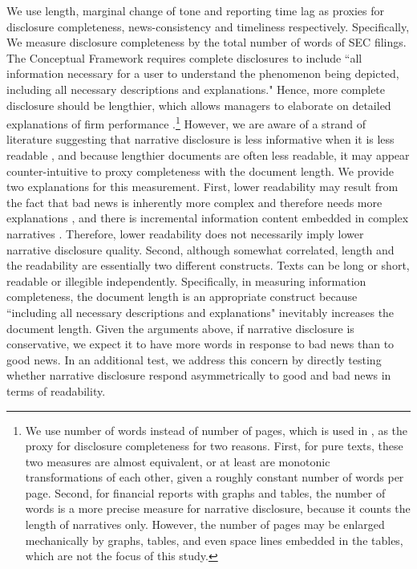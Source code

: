 \documentclass[letterpaper,11pt]{article}
\begin{document}
\begin{spacing}{1.5}
\noindent We use length, marginal change of tone and reporting time lag as proxies for disclosure completeness, news-consistency and timeliness respectively. Specifically, We measure disclosure completeness by the total number of words of SEC filings. The Conceptual Framework requires complete disclosures to include ``all information necessary for a user to understand the phenomenon being depicted, including all necessary descriptions and explanations." \cite[QC12]{fasbConceptualFrameworkFinancial2018} Hence, more complete disclosure should be lengthier, which allows managers to elaborate on detailed explanations of firm performance \cite{leuzDisclosureCostCapital2009}.\footnote{We use number of words instead of number of pages, which is used in , as the proxy for disclosure completeness for two reasons. First, for pure texts, these two measures are almost equivalent, or at least are monotonic transformations of each other, given a roughly constant number of words per page. Second, for financial reports with graphs and tables, the number of words is a more precise measure for narrative disclosure, because it counts the length of narratives only. However, the number of pages may be enlarged mechanically by graphs, tables, and even space lines embedded in the tables, which are not the focus of this study.} However, we are aware of a strand of literature suggesting that narrative disclosure is less informative when it is less readable \cite{liAnnualReportReadability2008, loEarningsManagementAnnual2017, loughranMeasuringReadabilityFinancial2014}, and because lengthier documents are often less readable, it may appear counter-intuitive to proxy completeness with the document length. We provide two explanations for this measurement. First, lower readability may result from the fact that bad news is inherently more complex and therefore needs more explanations \cite{bloomfieldDiscussionAnnualReport2008}, and there is incremental information content embedded in complex narratives \cite{busheeLinguisticComplexityFirm2018}. Therefore, lower readability does not necessarily imply lower narrative disclosure quality. Second, although somewhat correlated, length and the readability are essentially two different constructs. Texts can be long or short, readable or illegible independently. Specifically, in measuring information completeness, the document length is an appropriate construct because ``including all necessary descriptions and explanations" \cite[QC12]{fasbConceptualFrameworkFinancial2018} inevitably increases the document length. Given the arguments above, if narrative disclosure is conservative, we expect it to have more words in response to bad news than to good news. In an additional test, we address this concern by directly testing whether narrative disclosure respond asymmetrically to good and bad news in terms of readability.


\end{spacing}
\end{document}
